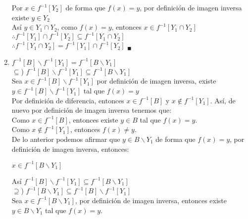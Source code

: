 \documentclass[12pt]{article}
\begin{document}
\begin{enumerate}[label=\alph*)]
    Por  $x \in f^{-1}[Y_2]$ de forma que $f(x) = y$, por definición de imagen inversa existe $y \in Y_2$\\

    Así $y \in Y_1 \cap Y_2$, como $f(x) = y$, entonces $x \in f^{-1}[Y_1 \cap Y_2]$\\

    $\therefore f^{-1}[Y_1] \cap f^{-1}[Y_2] \subseteq f^{-1} [Y_1 \cap Y_2]$\\

    $\therefore {\displaystyle f^{-1}} [Y_1 \cap Y_2] = {\displaystyle f^{-1}}[Y_1] \cap {\displaystyle f^{-1}}[Y_2]$ $_\blacksquare$

    \item $f^{-1} [B] \backslash  f^{-1} [Y_1] = f^{-1}[B \backslash Y_1]$\\

    $\subseteq$) $f^{-1} [B] \backslash  f^{-1} [Y_1] \subseteq f^{-1}[B \backslash Y_1]$\\

    Sea $x \in f^{-1} [B] \backslash  f^{-1} [Y_1]$ por definición de imagen inversa, existe $y \in f^{-1} [B] \backslash  f^{-1} [Y_1]$ tal que $f(x) = y$\\

    Por definición de diferencia, entonces $x \in f^{-1} [B]$ y $x \notin f^{-1} [Y_1]$. Así, de nuevo por definición de imagen inversa tenemos que:\\

    Como $x \in f^{-1} [B]$, entonces existe $y \in B$ tal que $f(x) = y$.\\

    Como $x \notin f^{-1} [Y_1]$, entonces  $f(x) \neq y$.\\

    De lo anterior podemos afirmar que $y \in B \backslash Y_1$ de forma que $f(x) = y$, por definición de imagen inversa, entonces:
    \begin{center}
        $x \in f^{-1}[B \backslash Y_1]$
    \end{center}
    Así $f^{-1} [B] \backslash  f^{-1} [Y_1] \subseteq f^{-1}[B \backslash Y_1]$\\

    $\supseteq$) $f^{-1}[B \backslash Y_1] \subseteq f^{-1} [B] \backslash  f^{-1} [Y_1]$\\

    Sea $x \in  f^{-1}[B \backslash Y_1]$, por definición de imagen inversa, entonces existe $y \in B \backslash Y_1$ tal que $f(x) = y$.\\


\end{enumerate}
\end{document}
